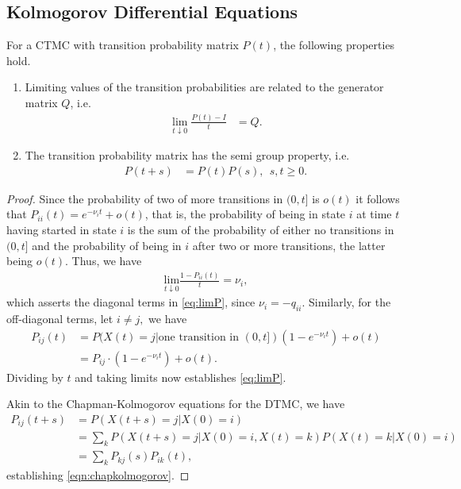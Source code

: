 \documentclass[a4paper,10pt,english]{article}
\begin{document}
\subsection{Kolmogorov Differential Equations}
\begin{lem} For a CTMC with transition probability matrix $P(t)$, the following properties hold.
\begin{enumerate}
\item Limiting values of the transition probabilities are related to the generator matrix $Q$, i.e.
\begin{align}
\label{eq:limP}
\lim_{t \downarrow 0} \frac{P(t)-I}{t} &= Q.
\end{align}
\item The transition probability matrix has the semi group property, i.e.
\begin{align}
P(t+s) &= P(t)P(s), ~~s,t \geq 0.
\label{eqn:chapkolmogorov}
\end{align}
\end{enumerate}
\begin{proof}
Since the probability of two of more transitions in $(0,t]$ is $o(t)$ it follows that $P_{ii}(t) = e^{-\nu_i t}+o(t)$, that is, the probability of being in state $i$ at time $t$ having started in state $i$ is the sum of the probability of either no transitions in $(0,t]$ and the probability of being in $i$ after two or more transitions, the latter being $o(t)$. Thus, we have
\begin{align}
\underset{t\downarrow 0}{\mathrm{lim }} \frac{1-P_{ii}(t) }{t} = \nu_i,
\end{align}
which asserts the diagonal terms in \eqref{eq:limP}, since $\nu_i = -q_{ii}.$
Similarly, for the off-diagonal terms, let $i\not = j,$ we have 
\begin{align}
P_{ij}(t) &= P(X(t)=j|\text{one transition in }(0,t])(1-e^{-\nu_i t})+ o(t)\\
&= P_{ij} \cdot (1-e^{-\nu_it})+o(t).
\end{align}
Dividing by $t$ and taking limits now establishes \eqref{eq:limP}.

Akin to the Chapman-Kolmogorov equations for the DTMC, we have
\begin{align*}
P_{ij}(t+s) &= P(X(t+s)=j|X(0)=i)\\
&=\sum_k P(X(t+s)=j|X(0)=i,X(t)=k)P(X(t)=k|X(0)=i)\\
&=\sum_k P_{kj}(s)P_{ik}(t),
\end{align*}
establishing \eqref{eqn:chapkolmogorov}.

\end{proof}
\end{lem}
\end{document}
